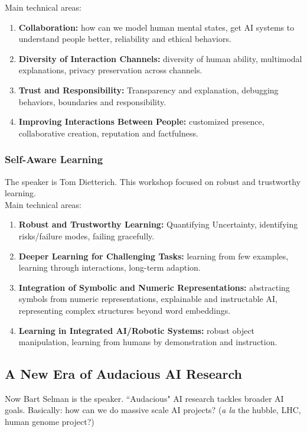Main technical areas:
\begin{enumerate}
    \item {\bf Collaboration:} how can we model human mental states, get AI systems to understand people better, reliability and ethical behaviors.
    \item {\bf Diversity of Interaction Channels:} diversity of human ability, multimodal explanations, privacy preservation across channels.
    \item {\bf Trust and Responsibility:} Transparency and explanation, debugging behaviors, boundaries and responsibility.
    \item {\bf Improving Interactions Between People:} customized presence, collaborative creation, reputation and factfulness.
\end{enumerate}

\subsubsection{Self-Aware Learning}

The speaker is Tom Dietterich. This workshop focused on robust and trustworthy learning. \\

Main technical areas:
\begin{enumerate}
    \item {\bf Robust and Trustworthy Learning:} Quantifying Uncertainty, identifying risks/failure modes, failing gracefully.
    \item {\bf Deeper Learning for Challenging Tasks:} learning from few examples, learning through interactions, long-term adaption.
    \item {\bf Integration of Symbolic and Numeric Representations:} abstracting symbols from numeric representations, explainable and instructable AI, representing complex structures beyond word embeddings.
    \item {\bf Learning in Integrated AI/Robotic Systems:} robust object manipulation, learning from humans by demonstration and instruction.
\end{enumerate}

\subsection{A New Era of Audacious AI Research}

Now Bart Selman is the speaker. ``Audacious" AI research tackles broader AI goals. Basically: how can we do massive scale AI projects? ({\it a la} the hubble, LHC, human genome project?) \\

